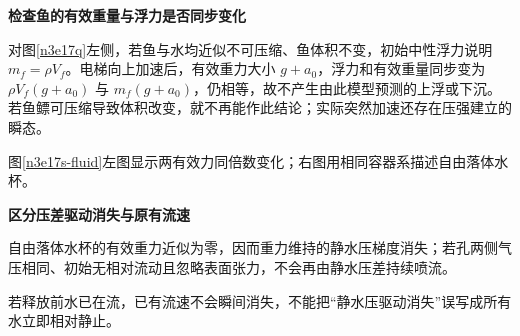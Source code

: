 \begin{solution}\textbf{检查鱼的有效重量与浮力是否同步变化}\par\nobreak
对图\ref{n3e17q}左侧，若鱼与水均近似不可压缩、鱼体积不变，初始中性浮力说明 $m_f=\rho V_f$。电梯向上加速后，有效重力大小 $g+a_0$，浮力和有效重量同步变为 $\rho V_f(g+a_0)$ 与 $m_f(g+a_0)$，仍相等，故不产生由此模型预测的上浮或下沉。若鱼鳔可压缩导致体积改变，就不再能作此结论；实际突然加速还存在压强建立的瞬态。


图\ref{n3e17s-fluid}左图显示两有效力同倍数变化；右图用相同容器系描述自由落体水杯。


\par\medskip{}\noindent\textbf{区分压差驱动消失与原有流速}\par\nobreak
自由落体水杯的有效重力近似为零，因而重力维持的静水压梯度消失；若孔两侧气压相同、初始无相对流动且忽略表面张力，不会再由静水压差持续喷流。

若释放前水已在流，已有流速不会瞬间消失，不能把“静水压驱动消失”误写成所有水立即相对静止。





\end{solution}
